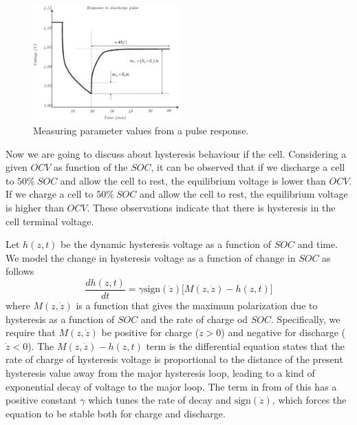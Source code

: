 \documentclass[11pt,a4paper]{article}
\numberwithin{equation}{section}
\newcommand{\sign}{\text{sign}}
\theoremstyle{it}
\theoremstyle{definition}
\begin{document}
\begin{figure}[H]
	\centering
	\includegraphics[width = 0.5\textwidth, width = 300pt, angle = 0, keepaspectratio]{figures/lithium_ion_battery/cell_response_2.eps}
	\captionsetup{width=0.5\textwidth}		
	\caption{Measuring parameter values from a pulse response.}
	\label{polarization_2}
\end{figure}
Now we are going to discuss about hysteresis behaviour if the cell. Considering a given $OCV$ as function of the $SOC$, it can be observed that if we discharge a cell to $50\%\ SOC$ and allow the cell to rest, the equilibrium voltage is lower than $OCV$. If we charge a cell to $50\%\ SOC$ and allow the cell to rest, the equilibrium voltage is higher than $OCV$. These observations indicate that there is hysteresis in the cell terminal voltage.

Let $h(z,t)$ be the dynamic hysteresis voltage as a function of $SOC$ and time. We model the change in hysteresis voltage as a function of change in $SOC$ as follows
\begin{equation}
	\frac{dh(z,t)}{dt} = \gamma\sign(\dot{z})\Big[M(z,\dot{z})-h(z,t)\Big]
\end{equation}
where $M(z,\dot{z})$ is a function that gives the maximum polarization due to hysteresis as a function of $SOC$ and the rate of charge od $SOC$.
Specifically, we require that $M(z,\dot{z})$ be positive for charge ($\dot{z}>0$) and negative for discharge ($\dot{z}<0$). The $M(z,\dot{z})-h(z,t)$ term is the differential equation states that the rate of charge of hysteresis voltage is proportional to the distance of the present hysteresis value away from the major hysteresis loop, leading to a kind of exponential decay of voltage to the major loop. The term in from of this has a positive constant $\gamma$ which tunes the rate of decay and $\sign(\dot{z})$, which forces the equation to be stable both for charge and discharge.
\end{document}
